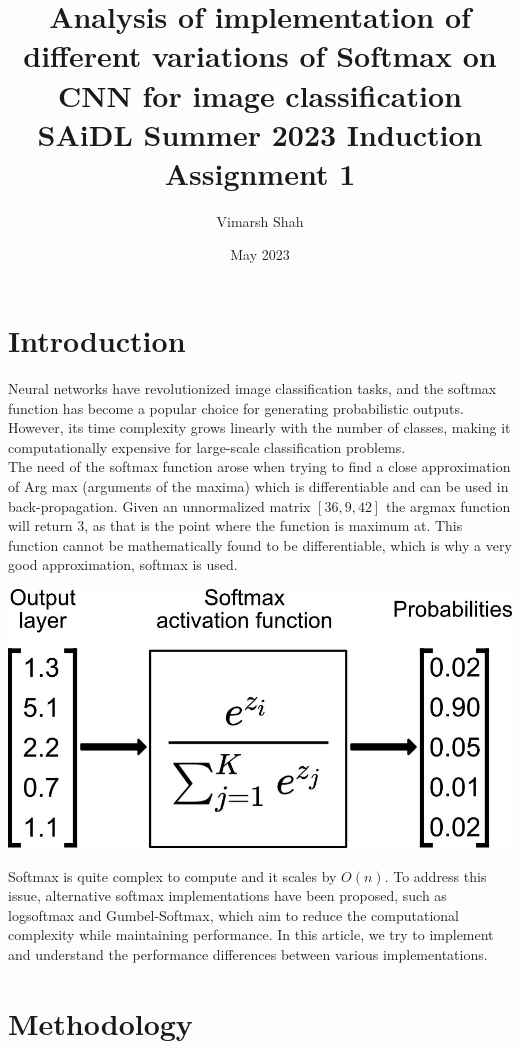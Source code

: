 \documentclass{article}
\title{%
  Analysis of implementation of different variations of Softmax on CNN for image classification \\
  \large SAiDL Summer 2023 Induction Assignment 1}
\author{Vimarsh Shah }
\date{May 2023}
\begin{document}
\maketitle

\section{Introduction}


Neural networks have revolutionized image classification tasks, and the softmax function has become a popular choice for generating probabilistic outputs. However, its time complexity grows linearly with the number of classes, making it computationally expensive for large-scale classification problems.\\

The need of the softmax function arose when trying to find a close approximation of Arg max (arguments of the maxima) which is differentiable and can be used in back-propagation. Given an unnormalized matrix \([36, 9, 42]\) the argmax function will return 3, as that is the point where the function is maximum at. This function cannot be mathematically found to be differentiable, which is why a very good approximation, softmax is used.

\vspace{6pt} \vspace{6pt}
\includegraphics[width=0.6\linewidth]{images/softmaxworkingsimple.jpg}
\vspace{6pt}

Softmax is quite complex to compute and it scales by \(O(n)\). To address this issue, alternative softmax implementations have been proposed, such as logsoftmax and Gumbel-Softmax, which aim to reduce the computational complexity while maintaining performance. In this article, we try to implement and understand the performance differences between various implementations.

\section{Methodology}
\end{document}
